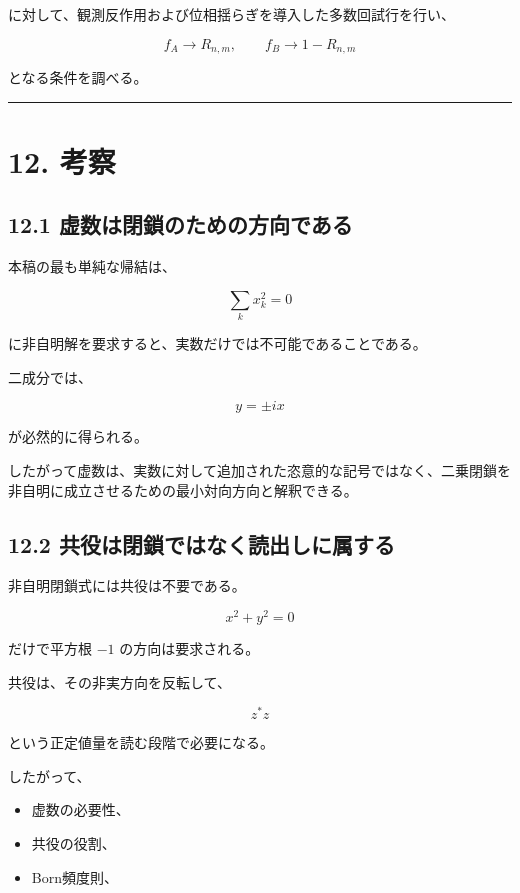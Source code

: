 \documentclass[
  a4paper,
  10pt]{article}
\providecommand{\tightlist}{%
  \setlength{\itemsep}{0pt}\setlength{\parskip}{0pt}}
\begin{document}
に対して、観測反作用および位相揺らぎを導入した多数回試行を行い、

\[
f_A\to R_{n,m},
\qquad
f_B\to1-R_{n,m}
\]

となる条件を調べる。

\begin{center}\rule{0.5\linewidth}{0.5pt}\end{center}

\section{12. 考察}\label{12-ux8003ux5bdf}

\subsection{12.1
虚数は閉鎖のための方向である}\label{121-ux865aux6570ux306fux9589ux9396ux306eux305fux3081ux306eux65b9ux5411ux3067ux3042ux308b}

本稿の最も単純な帰結は、

\[
\sum_kx_k^2=0
\]

に非自明解を要求すると、実数だけでは不可能であることである。

二成分では、

\[
y=\pm ix
\]

が必然的に得られる。

したがって虚数は、実数に対して追加された恣意的な記号ではなく、二乗閉鎖を非自明に成立させるための最小対向方向と解釈できる。

\subsection{12.2
共役は閉鎖ではなく読出しに属する}\label{122-ux5171ux5f79ux306fux9589ux9396ux3067ux306fux306aux304fux8aadux51faux3057ux306bux5c5eux3059ux308b}

非自明閉鎖式には共役は不要である。

\[
x^2+y^2=0
\]

だけで平方根 \(-1\) の方向は要求される。

共役は、その非実方向を反転して、

\[
z^*z
\]

という正定値量を読む段階で必要になる。

したがって、

\begin{itemize}
\tightlist
\item
  虚数の必要性、
\item
  共役の役割、
\item
  Born頻度則、
\end{itemize}
\end{document}
